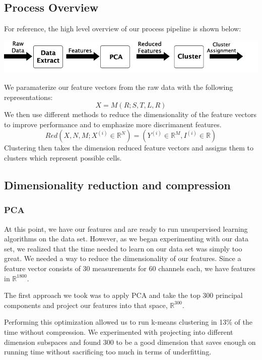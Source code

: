 \documentclass{acm_proc_article-sp}
\begin{document}
\subsection{Process Overview}

For reference, the high level overview of our process pipeline is shown
below: 
\begin{center}
  \includegraphics[width=0.8\linewidth]{../poster/images/pipeline.jpg}
\end{center}

We paramaterize our feature vectors from the raw data with the following representations:
$$X = M(R; S,T,L,R)$$
We then use different methods to reduce the dimensionality of
the feature vectors to improve performance and to emphasize
more discrimanent features.
  $$Red(X,N,M; X^{(i)} \in \mathbb{R}^N) = (Y^{(i)} \in
  \mathbb{R}^M,I^{(i)} \in \mathbb{R})$$
Clustering then takes the dimension reduced feature vectors
and assigns them to clusters which represent possible cells.

\subsection{Dimensionality reduction and compression}
\subsubsection{PCA}
At this point, we have our features and are ready to run unsupervised
learning algorithms on the data set. However, as we began experimenting
with our data set, we realized that the time needed to learn on our data
set was simply too great. We needed a way to reduce the dimensionality of
our features. Since a feature vector consists of 30 measurements for 60
channels each, we have features in $\mathbb{R}^{1800}$.

The first approach we took was to apply PCA and take the top 300 principal
components and project our features into that space, $\mathbb{R}^{300}$.

Performing this optimization allowed us to run k-means clustering in 13\%
of the time without compression. We experimented with projecting into
different dimension subspaces and found 300 to be a good dimension that
saves enough on running time without sacrificing too much in terms of
underfitting.
\end{document}

